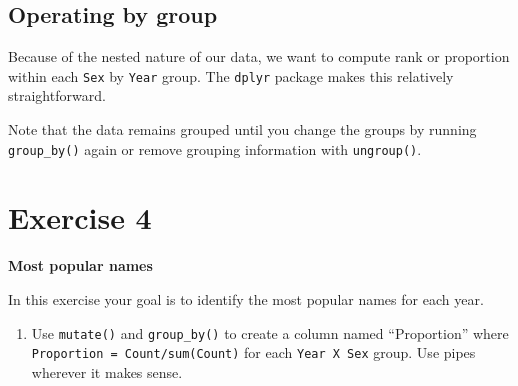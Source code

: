 \documentclass[]{book}
\newenvironment{Shaded}{\begin{snugshade}}{\end{snugshade}}
\newcommand{\KeywordTok}[1]{\textcolor[rgb]{0.13,0.29,0.53}{\textbf{#1}}}
\newcommand{\DataTypeTok}[1]{\textcolor[rgb]{0.13,0.29,0.53}{#1}}
\newcommand{\StringTok}[1]{\textcolor[rgb]{0.31,0.60,0.02}{#1}}
\newcommand{\OperatorTok}[1]{\textcolor[rgb]{0.81,0.36,0.00}{\textbf{#1}}}
\newcommand{\NormalTok}[1]{#1}
\providecommand{\tightlist}{%
  \setlength{\itemsep}{0pt}\setlength{\parskip}{0pt}}
\begin{document}
\begin{Shaded}
\end{Shaded}

\subsection{Operating by group}\label{operating-by-group}

Because of the nested nature of our data, we want to compute rank or
proportion within each \texttt{Sex} by \texttt{Year} group. The
\texttt{dplyr} package makes this relatively straightforward.

\begin{Shaded}
\end{Shaded}

Note that the data remains grouped until you change the groups by
running \texttt{group\_by()} again or remove grouping information with
\texttt{ungroup()}.

\section{Exercise 4}\label{exercise-4}

\textbf{Most popular names}

In this exercise your goal is to identify the most popular names for
each year.

\begin{enumerate}
\def\labelenumi{\arabic{enumi}.}
\tightlist
\item
  Use \texttt{mutate()} and \texttt{group\_by()} to create a column
  named ``Proportion'' where \texttt{Proportion\ =\ Count/sum(Count)}
  for each \texttt{Year\ X\ Sex} group. Use pipes wherever it makes
  sense.
\end{enumerate}
\end{document}
